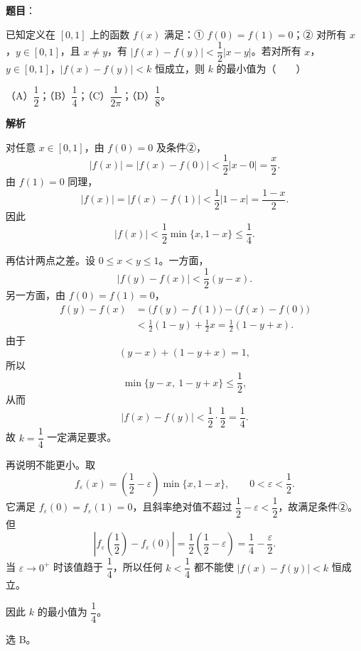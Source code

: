 \begin{answer}

\textbf{题目}：

已知定义在 $[0,1]$ 上的函数 $f(x)$ 满足：① $f(0)=f(1)=0$；② 对所有 $x$，$y\in[0,1]$，且 $x\neq y$，有 $|f(x)-f(y)|<\dfrac12|x-y|$。若对所有 $x$，$y\in[0,1]$，$|f(x)-f(y)|<k$ 恒成立，则 $k$ 的最小值为\mbox{（　　）}

（A）$\dfrac12$；（B）$\dfrac14$；（C）$\dfrac1{2\pi}$；（D）$\dfrac18$。

\textbf{解析}

对任意 $x\in[0,1]$，由 $f(0)=0$ 及条件②，
\nopagebreak[4]
\[|f(x)|=|f(x)-f(0)|<\frac12|x-0|=\frac x2.\]
由 $f(1)=0$ 同理，
\nopagebreak[4]
\[|f(x)|=|f(x)-f(1)|<\frac12|1-x|=\frac{1-x}2.\]
因此
\nopagebreak[4]
\[|f(x)|<\frac12\min\{x,1-x\}\leqslant\frac14.\]

再估计两点之差。设 $0\leqslant x<y\leqslant1$。一方面，
\nopagebreak[4]
\[|f(y)-f(x)|<\frac12(y-x).\]
另一方面，由 $f(0)=f(1)=0$，
\nopagebreak[4]
\[\begin{aligned}
f(y)-f(x)
&=\bigl(f(y)-f(1)\bigr)-\bigl(f(x)-f(0)\bigr)\\
&<\frac12(1-y)+\frac12x
=\frac12(1-y+x).
\end{aligned}\]
由于
\nopagebreak[4]
\[(y-x)+(1-y+x)=1,\]
所以
\nopagebreak[4]
\[\min\{y-x,\ 1-y+x\}\leqslant\frac12,\]
从而
\nopagebreak[4]
\[|f(x)-f(y)|<\frac12\cdot\frac12=\frac14.\]
故 $k=\dfrac14$ 一定满足要求。

再说明不能更小。取
\nopagebreak[4]
\[f_\varepsilon(x)=\left(\frac12-\varepsilon\right)\min\{x,1-x\},\qquad 0<\varepsilon<\frac12.\]
它满足 $f_\varepsilon(0)=f_\varepsilon(1)=0$，且斜率绝对值不超过 $\dfrac12-\varepsilon<\dfrac12$，故满足条件②。但
\nopagebreak[4]
\[\left|f_\varepsilon\left(\frac12\right)-f_\varepsilon(0)\right|
=\frac12\left(\frac12-\varepsilon\right)
=\frac14-\frac\varepsilon2.\]
当 $\varepsilon\to0^+$ 时该值趋于 $\dfrac14$，所以任何 $k<\dfrac14$ 都不能使 $|f(x)-f(y)|<k$ 恒成立。

因此 $k$ 的最小值为 $\dfrac14$。

选 B。


\end{answer}
